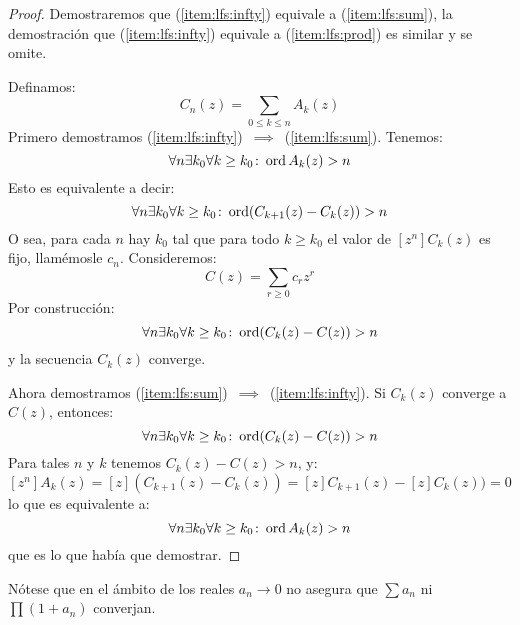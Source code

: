   \begin{proof}
    Demostraremos que (\ref{item:lfs:infty}) equivale a (\ref{item:lfs:sum}),
    la demostración que (\ref{item:lfs:infty}) equivale a (\ref{item:lfs:prod})
    es similar y se omite.

    Definamos:
    \begin{equation*}
      C_n(z)
	= \sum_{0 \le k \le n} A_k(z)
    \end{equation*}
    Primero demostramos
    (\ref{item:lfs:infty})~\(\implies\)~(\ref{item:lfs:sum}).
    Tenemos:
    \begin{equation*}
      \forall n \exists k_0 \forall k \ge k_0 \colon \operatorname{ord} A_k(z) > n
    \end{equation*}
    Esto es equivalente a decir:
    \begin{equation*}
      \forall n \exists k_0 \forall k \ge k_0
	\colon \operatorname{ord} (C_{k + 1}(z) - C_k(z)) > n
    \end{equation*}
    O sea,
    para cada \(n\) hay \(k_0\) tal que
    para todo \(k \ge k_0\) el valor de \(\left[ z^n \right] C_k(z)\)
    es fijo,
    llamémosle \(c_n\).
    Consideremos:
    \begin{equation*}
      C(z)
	= \sum_{r \ge 0} c_r z^r
    \end{equation*}
    Por construcción:
    \begin{equation*}
      \forall n \exists k_0 \forall k \ge k_0
	\colon \operatorname{ord} (C_k(z) - C(z)) > n
    \end{equation*}
    y la secuencia \(C_k(z)\) converge.

    Ahora demostramos
    (\ref{item:lfs:sum})~\(\implies\)~(\ref{item:lfs:infty}).
    Si \(C_k(z)\) converge a \(C(z)\),
    entonces:
    \begin{equation*}
      \forall n \exists k_0 \forall k \ge k_0
	\colon \operatorname{ord} (C_k(z) - C(z)) > n
    \end{equation*}
    Para tales \(n\) y \(k\)
    tenemos \(C_k(z) - C(z) > n\),
    y:
    \begin{equation*}
      \left[ z^n \right] A_k(z)
	= \left[ z \right] (C_{k + 1}(z) - C_k(z))
	= \left[ z \right] C_{k + 1}(z) - \left[ z \right] C_k(z))
	= 0
    \end{equation*}
    lo que es equivalente a:
    \begin{equation*}
      \forall n \exists k_0 \forall k \ge k_0
	\colon \operatorname{ord} A_k(z) > n
    \end{equation*}
    que es lo que había que demostrar.
  \end{proof}
  Nótese que en el ámbito de los reales \(a_n \rightarrow 0\)
  no asegura que \(\sum a_n\) ni \(\prod (1 + a_n)\) converjan.

